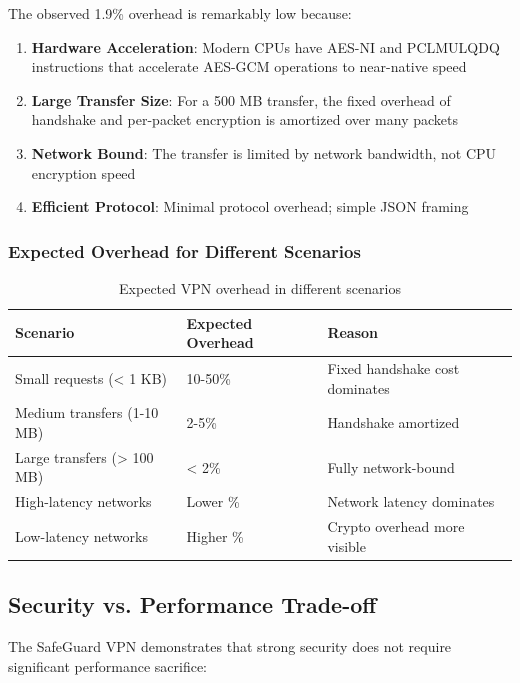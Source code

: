 \documentclass[12pt,a4paper]{article}
\begin{document}
The observed 1.9\% overhead is remarkably low because:

\begin{enumerate}
    \item \textbf{Hardware Acceleration}: Modern CPUs have AES-NI and PCLMULQDQ instructions that accelerate AES-GCM operations to near-native speed
    
    \item \textbf{Large Transfer Size}: For a 500 MB transfer, the fixed overhead of handshake and per-packet encryption is amortized over many packets
    
    \item \textbf{Network Bound}: The transfer is limited by network bandwidth, not CPU encryption speed
    
    \item \textbf{Efficient Protocol}: Minimal protocol overhead; simple JSON framing
\end{enumerate}

\subsubsection{Expected Overhead for Different Scenarios}

\begin{table}[H]
\centering
\begin{tabular}{@{}lll@{}}
\toprule
\textbf{Scenario} & \textbf{Expected Overhead} & \textbf{Reason} \\ \midrule
Small requests (< 1 KB) & 10-50\% & Fixed handshake cost dominates \\
Medium transfers (1-10 MB) & 2-5\% & Handshake amortized \\
Large transfers (> 100 MB) & < 2\% & Fully network-bound \\
High-latency networks & Lower \% & Network latency dominates \\
Low-latency networks & Higher \% & Crypto overhead more visible \\
\bottomrule
\end{tabular}
\caption{Expected VPN overhead in different scenarios}
\end{table}

\subsection{Security vs. Performance Trade-off}

The SafeGuard VPN demonstrates that strong security does not require significant performance sacrifice:
\end{document}
